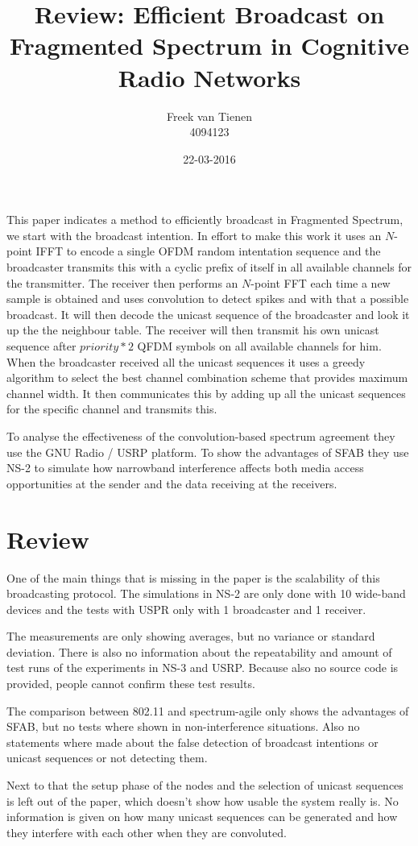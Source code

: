 \documentclass[]{article}
\begin{document}
\title{Review: Efficient Broadcast on Fragmented Spectrum in Cognitive Radio Networks}
\author{Freek van Tienen \\ 4094123}
\date{22-03-2016}
\maketitle

This paper indicates a method to efficiently broadcast in Fragmented Spectrum, we start with the broadcast intention.
In effort to make this work it uses an $N$-point IFFT to encode a single OFDM random intentation sequence and the broadcaster transmits this with a cyclic prefix of itself in all available channels for the transmitter.
The receiver then performs an $N$-point FFT each time a new sample is obtained and uses convolution to detect spikes and with that a possible broadcast.
It will then decode the unicast sequence of the broadcaster and look it up the the neighbour table.
The receiver will then transmit his own unicast sequence after $priority * 2$ QFDM symbols on all available channels for him.
When the broadcaster received all the unicast sequences it  uses a greedy algorithm to select the best channel combination scheme that provides maximum channel width.
It then communicates this by adding up all the unicast sequences for the specific channel and transmits this.

To analyse the effectiveness of the convolution-based spectrum agreement they use the GNU Radio / USRP platform.
To show the advantages of SFAB they use NS-2 to simulate how narrowband interference affects both media access opportunities at the sender and the data receiving at the receivers.

\section*{Review}
One of the main things that is missing in the paper is the scalability of this broadcasting protocol.
The simulations in NS-2 are only done with 10 wide-band devices and the tests with USPR only with 1 broadcaster and 1 receiver. 

The measurements are only showing averages, but no variance or standard deviation.
There is also no information about the repeatability and amount of test runs of the experiments in NS-3 and USRP.
Because also no source code is provided, people cannot confirm these test results.

The comparison between 802.11 and spectrum-agile only shows the advantages of SFAB, but no tests where shown in non-interference situations.
Also no statements where made about the false detection of broadcast intentions or unicast sequences or not detecting them.

Next to that the setup phase of the nodes and the selection of unicast sequences is left out of the paper, which doesn't show how usable the system really is.
No information is given on how many unicast sequences can be generated and how they interfere with each other when they are convoluted.
\end{document}
